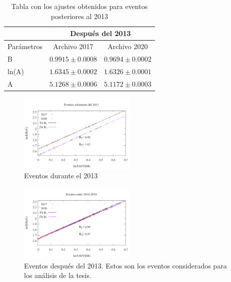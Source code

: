 \begin{table}[H]
\centering
\begin{tabular}{l|l|l|}
\cline{2-3}
                                 & \multicolumn{2}{c|}{Después del 2013}                                 \\ \hline
\multicolumn{1}{|l|}{Parámetros} & \multicolumn{1}{c|}{Archivo 2017} & \multicolumn{1}{c|}{Archivo 2020} \\ \hline
\multicolumn{1}{|l|}{B}          & $0.9915 \pm 0.0008 $              & $0.9694 \pm 0.0002$               \\ \hline
\multicolumn{1}{|l|}{ln(A)}      & $1.6345 \pm 0.0002$               & $1.6326 \pm 0.0001$               \\ \hline
\multicolumn{1}{|l|}{A}          & $5.1268 \pm 0.0006$               & $5.1172 \pm 0.0003$               \\ \hline
\end{tabular}
\caption{Tabla con los ajustes obtenidos para eventos posteriores al 2013}
\end{table}


\begin{figure}[H]
	\centering
	\includegraphics[width=0.5\textwidth]{curva_calibracion_solamente_2013.png}
	\caption{Eventos durante el 2013}
	\label{fig:solamente_2013}
\end{figure}



\begin{figure}[H]
	\centering
	\includegraphics[width=0.5\textwidth]{curva_calibracion_comparando_2014-2020.png}
	\caption{Eventos después del 2013. Estos son los eventos considerados para los análisis de la tesis.}
	\label{fig:despues_2013}
\end{figure}